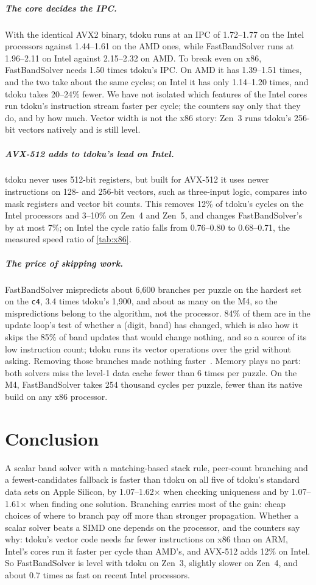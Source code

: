 \documentclass[a4paper,USenglish,cleveref,anonymous]{lipics-v2021}
\newif\ifanon
\newcommand{\selfcite}[1]{\ifanon[anonymized]\else\cite{#1}\fi}
\begin{document}
\subparagraph{The core decides the IPC.} With the identical AVX2 binary, tdoku runs at an IPC of 1.72--1.77 on the Intel
processors against 1.44--1.61 on the AMD ones, while FastBandSolver runs at 1.96--2.11 on Intel against 2.15--2.32 on
AMD. To break even on x86, FastBandSolver needs 1.50 times tdoku's IPC. On AMD it has 1.39--1.51 times, and the two take
about the same cycles; on Intel it has only 1.14--1.20 times, and tdoku takes 20--24\% fewer. We have not isolated
which features of the Intel cores run tdoku's instruction stream faster per cycle; the counters say only that they do,
and by how much. Vector width is not the x86 story: Zen~3 runs tdoku's 256-bit vectors natively and is still level.

\subparagraph{AVX-512 adds to tdoku's lead on Intel.} tdoku never uses 512-bit registers, but built for AVX-512 it uses
newer instructions on 128- and 256-bit vectors, such as three-input logic, compares into mask registers and vector bit
counts. This removes 12\% of tdoku's cycles on the Intel processors and 3--10\% on Zen~4 and Zen~5, and changes
FastBandSolver's by at most 7\%; on Intel the cycle ratio falls from 0.76--0.80 to 0.68--0.71, the measured speed
ratio of \cref{tab:x86}.

\subparagraph{The price of skipping work.} FastBandSolver mispredicts about 6{,}600 branches per puzzle on the hardest
set on the \texttt{c4}, 3.4 times tdoku's 1{,}900, and about as many on the M4, so the mispredictions belong to the
algorithm, not the processor. 84\% of them are in the update loop's test of whether a (digit, band) has changed, which
is also how it skips the 85\% of band updates that would change nothing, and so a source of its low instruction count;
tdoku runs its vector operations over the grid without asking. Removing those branches made nothing
faster~\selfcite{kelly2026full}. Memory plays no part: both solvers miss the level-1 data cache fewer than 6 times per
puzzle. On the M4, FastBandSolver takes 254 thousand cycles per puzzle, fewer than its native build on any x86
processor.

\section{Conclusion}

A scalar band solver with a matching-based stack rule, peer-count branching and a fewest-candidates fallback is faster
than tdoku on all five of tdoku's standard data sets on Apple Silicon, by 1.07--1.62$\times$ when checking uniqueness
and by 1.07--1.61$\times$ when finding one solution. Branching carries most of the gain: cheap choices of where to
branch pay off more than stronger propagation. Whether a scalar solver beats a SIMD one depends on the processor, and
the counters say why: tdoku's vector code needs far fewer instructions on x86 than on ARM, Intel's cores run it faster
per cycle than AMD's, and AVX-512 adds 12\% on Intel. So FastBandSolver is level with tdoku on Zen~3, slightly slower on
Zen~4, and about 0.7 times as fast on recent Intel processors.
\end{document}
